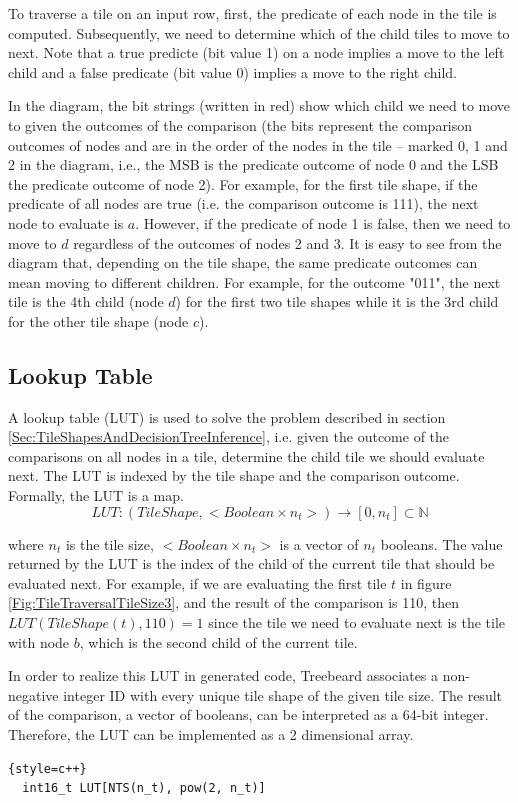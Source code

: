 To traverse a tile on an input row, first, the predicate of each node in the tile is computed. Subsequently, we need to determine which of the child tiles to move to next. Note that a true predicte (bit value 1) on a node implies a move to the left child and a false predicate (bit value 0) implies a move to the right child.

In the diagram, the bit strings (written in red) show which child we need to move to given the outcomes of the comparison (the bits represent the comparison outcomes of nodes and are in the order of the nodes in the tile -- marked 0, 1 and 2 in the diagram, i.e., the MSB is the predicate outcome of node 0 and the LSB the predicate outcome of node 2). For example, for the first tile shape, if the predicate of all nodes are true (i.e. the comparison outcome is 111), the next node to evaluate is $a$. However, if the predicate of node 1 is false, then we need to move to $d$ regardless of the outcomes of nodes 2 and 3. It is easy to see from the diagram that, depending on the tile shape, the same predicate outcomes can mean moving to different children. For example, for the outcome "011", the next tile is the 4th child (node $d$) for the first two tile shapes while it is the 3rd child for the other tile shape (node $c$).

\subsection{Lookup Table}
A lookup table (LUT) is used to solve the problem described in section \ref{Sec:TileShapesAndDecisionTreeInference}, i.e. given the outcome of the comparisons on all nodes in a tile, determine the child tile we should evaluate next. The LUT is indexed by the tile shape and the comparison outcome. Formally, the LUT is a map.
\[
LUT : (TileShape, < Boolean \times n_t >) \rightarrow [0, n_t] \subset \mathbb{N}
\]

where $n_t$ is the tile size, $< Boolean \times n_t >$ is a vector of $n_t$ booleans. The value returned by the LUT is the index of the child of the current tile that should be evaluated next. For example, if we are evaluating the first tile $t$ in figure \ref{Fig:TileTraversalTileSize3}, and the result of the comparison is 110, then $LUT(TileShape(t), 110)=1$ since the tile we need to evaluate next is the tile with node $b$, which is the second child of the current tile.

In order to realize this LUT in generated code, Treebeard associates a non-negative integer ID with every unique tile shape of the given tile size. The result of the comparison, a vector of booleans, can be interpreted as a 64-bit integer. Therefore, the LUT can be implemented as a 2 dimensional array.
\begin{lstlisting}{style=c++}
  int16_t LUT[NTS(n_t), pow(2, n_t)]  
\end{lstlisting}

